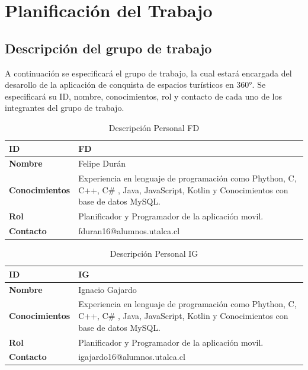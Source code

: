 \section{Planificación del Trabajo}

\subsection{Descripción del grupo de trabajo}
A continuación se especificará el grupo de trabajo, la cual estará encargada del desarollo de la aplicación de conquista de espacios turísticos en 360°. Se especificará su ID, nombre, conocimientos, rol y contacto de cada uno de los integrantes del grupo de trabajo.

\begin{table}[H]
    \centering
        \begin{tabular}{|l | p{12cm} |}        
        \hline
        \textbf{ID} & FD \\
        \hline
        \textbf{Nombre} & Felipe Durán \\
        \hline
        \textbf{Conocimientos} & Experiencia en lenguaje de programación como Phython, C, C++, C\# , Java, JavaScript, Kotlin y Conocimientos con base de datos MySQL. \\
        \hline
        \textbf{Rol} & Planificador y Programador de la aplicación movil. \\    
        \hline
        \textbf{Contacto} & fduran16@alumnos.utalca.cl \\
        \hline            
        \end{tabular}
    \caption{Descripción Personal FD}
\end{table}


\begin{table}[H]
    \centering
        \begin{tabular}{|l | p{12cm} |}        
        \hline
        \textbf{ID} & IG \\
        \hline
        \textbf{Nombre} & Ignacio Gajardo \\
        \hline
        \textbf{Conocimientos} & Experiencia en lenguaje de programación como Phython, C, C++, C\# , Java, JavaScript, Kotlin y Conocimientos con base de datos MySQL. \\
        \hline
        \textbf{Rol} & Planificador y Programador de la aplicación movil. \\    
        \hline
        \textbf{Contacto} & igajardo16@alumnos.utalca.cl \\
        \hline            
        \end{tabular}
    \caption{Descripción Personal IG}
\end{table}


